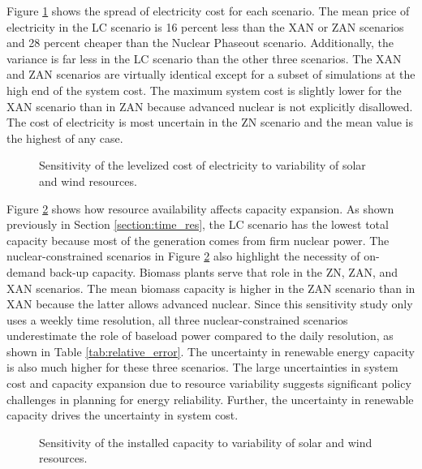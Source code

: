 Figure \ref{fig:obj_cost_plot} shows the spread of electricity cost for each scenario.
The mean price of electricity in the \gls{LC} scenario is 16 percent less than
the \gls{XAN} or \gls{ZAN} scenarios and 28 percent cheaper than the Nuclear Phaseout scenario.
Additionally, the variance is far less in the \gls{LC} scenario than the other
three scenarios. The \gls{XAN} and \gls{ZAN} scenarios are virtually identical
except for a subset of simulations at the high end of the system cost. The maximum
system cost is slightly lower for the \gls{XAN} scenario than in \gls{ZAN} because advanced
nuclear is not explicitly disallowed. The cost of electricity is most uncertain
in the \gls{ZN} scenario and the mean value is the highest of any case.

\begin{figure}[H]
  \centering
  \resizebox{0.95\columnwidth}{!}{}
  \caption{Sensitivity of the levelized cost of electricity to variability of
   solar and wind resources.}
  \label{fig:obj_cost_plot}
\end{figure}

Figure \ref{fig:il_capacity} shows how resource availability affects capacity
expansion. As shown previously in Section \ref{section:time_res}, the \gls{LC} scenario
has the lowest total capacity because most of the generation comes from firm nuclear
power. The nuclear-constrained scenarios in Figure \ref{fig:il_capacity} also
highlight the necessity of on-demand back-up capacity. Biomass plants serve that role
in the \gls{ZN}, \gls{ZAN}, and \gls{XAN} scenarios. The mean biomass capacity is higher
in the \gls{ZAN} scenario than in \gls{XAN} because the latter allows advanced nuclear. Since
this sensitivity study only uses a weekly time resolution, all three nuclear-constrained
scenarios underestimate the role of baseload power compared to the daily resolution,
as shown in Table \ref{tab:relative_error}. The uncertainty in renewable energy
capacity is also much higher for these three scenarios.
The large uncertainties in system cost and capacity expansion due to resource
variability suggests significant policy challenges in planning for energy
reliability. Further, the uncertainty in renewable capacity drives the uncertainty
in system cost.


\begin{figure}[H]
  \centering
  \resizebox{0.95\columnwidth}{!}{}
  \caption{Sensitivity of the installed capacity to variability of
   solar and wind resources.}
  \label{fig:il_capacity}
\end{figure}

